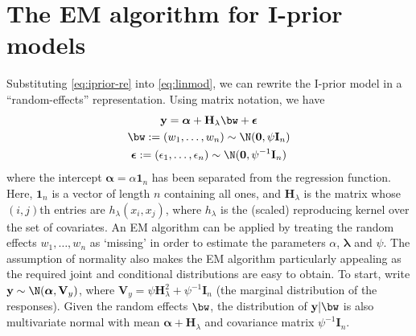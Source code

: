 \documentclass[english, 11pt]{article}
\begin{document}
\listoftodos[To-do list]

\newcommand{\Hlam}{\mathbf H_\lambda}
\newcommand{\blam}{\boldsymbol\lambda}
\newcommand{\Vy}{\mathbf{V}_y}
\newcommand{\wtilde}{\tilde{\mathbf w}}
\newcommand{\Wtilde}{\tilde{\mathbf W}}
\newcommand{\Vtilde}{\tilde{\mathbf V}}

\section{The EM algorithm for I-prior models}
\label{apx:b}

Substituting \eqref{eq:iprior-re} into \eqref{eq:linmod}, we can rewrite the I-prior model in a ``random-effects'' representation. Using matrix notation, we have%
\begin{align}\label{eq:iprior-re2}
	\begin{gathered}
		\mathbf y = \boldsymbol{\alpha} + \Hlam\bw + \boldsymbol\epsilon \\
		\bw := (w_1, \dots, w_n) \sim \N(\mathbf 0, \psi\mathbf I_n) \\
		\boldsymbol\epsilon := (\epsilon_1, \dots, \epsilon_n) \sim \N(\mathbf 0, \psi^{-1} \mathbf I_n) 
	\end{gathered}
\end{align}
where the intercept $\boldsymbol\alpha = \alpha \mathbf 1_{n}$ has been separated from the regression function. Here, $\mathbf 1_{n}$ is a vector of length $n$ containing all ones, and $\Hlam$ is the matrix whose $(i,j)$th entries are $h_\lambda(x_i, x_j)$, where $h_\lambda$ is the (scaled) reproducing kernel over the set of covariates. An EM algorithm can be applied by treating the random effects $w_1, \dots, w_n$ as `missing' in order to estimate the parameters $\alpha$, $\blam$ and $\psi$. The assumption of normality also makes the EM algorithm particularly appealing as the required joint and conditional distributions are easy to obtain. To start, write $\mathbf y \sim \N(\boldsymbol\alpha, \mathbf V_y)$, where $\mathbf V_y = \psi{\mathbf H}_{\lambda}^2 + \psi^{-1}\mathbf I_n$ (the marginal distribution of the responses). Given the random effects $\bw$, the distribution of $\mathbf y|\bw$ is also multivariate normal with mean $\boldsymbol\alpha + \mathbf H_\lambda$ and covariance matrix $\psi^{-1}\mathbf I_n$.
\end{document}
